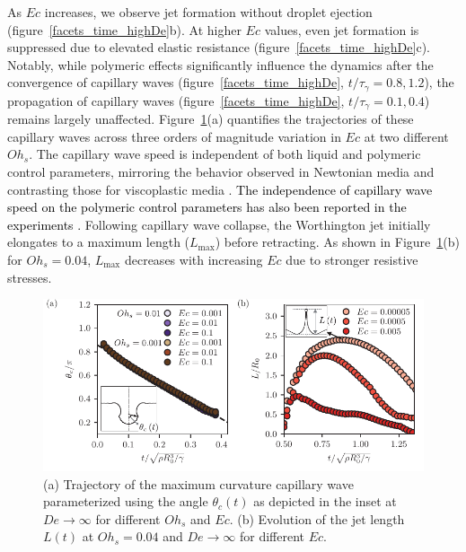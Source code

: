 \documentclass{jfm}
\newcommand{\rev}[1]{{\textcolor{black}{#1}}}
\begin{document}
As $Ec$ increases, we observe jet formation without droplet ejection (figure~\ref{facets_time_highDe}b). At higher $Ec$ values, even jet formation is suppressed due to elevated elastic resistance (figure~\ref{facets_time_highDe}c).
Notably, while polymeric effects significantly influence the dynamics after the convergence of capillary waves (figure~\ref{facets_time_highDe}, $t/\tau_\gamma = 0.8, 1.2$), the propagation of capillary waves (figure~\ref{facets_time_highDe}, $t/\tau_\gamma = 0.1, 0.4$) remains largely unaffected. Figure~\ref{theta_time}(a) quantifies the trajectories of these capillary waves across three orders of magnitude variation in $Ec$ at two different $Oh_s$. The capillary wave speed is independent of both liquid and polymeric control parameters, mirroring the behavior observed in Newtonian media \citep{gordillo2019capillary} and contrasting those for viscoplastic media \citep{sanjay-2022-JFM}. \rev{The independence of capillary wave speed on the polymeric control parameters has also been reported in the experiments \citep{cabalganteeffect}.}
Following capillary wave collapse, the Worthington jet initially elongates to a maximum length ($L_{\text{max}}$) before retracting. As shown in Figure~\ref{theta_time}(b) for $Oh_s = 0.04$, $L_{\text{max}}$ decreases with increasing $Ec$ due to stronger resistive stresses.

\begin{figure}
	\includegraphics[width=\textwidth]{theta_t_02-eps-converted-to.pdf}
	\caption{(a) Trajectory of the maximum curvature capillary wave parameterized using the angle $\theta_c(t)$ as depicted in the inset at $De \to \infty$ for different $Oh_s$ and $Ec$. (b) Evolution of the jet length $L(t)$ at $Oh_s = 0.04$ and $De \to \infty$ for different $Ec$.}
	\label{theta_time}
\end{figure}
\end{document}
